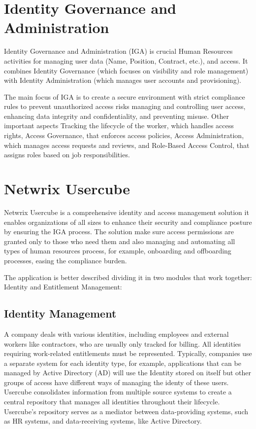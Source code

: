 \section{Identity Governance and Administration}

Identity Governance and Administration (IGA) is crucial Human Resources activities for managing user data (Name, Position, Contract, etc.), and access. It combines Identity Governance (which focuses on visibility and role management) with Identity Administration (which manages user accounts and provisioning).

The main focus of IGA is to create a secure environment with strict compliance rules to prevent unauthorized access risks managing and controlling user access, enhancing data integrity and confidentiality, and preventing misuse. Other important aspects Tracking the lifecycle of the worker, which handles access rights, Access Governance, that enforces access policies, Access Administration, which manages access requests and reviews, and Role-Based Access Control, that assigns roles based on job responsibilities.


\section{Netwrix Usercube}

Netwrix Usercube is a comprehensive identity and access management solution it enables organizations of all sizes to enhance their security and compliance posture by ensuring the IGA process. The solution make sure access permissions are granted only to those who need them and also managing and automating all types of human resources process, for example, onboarding and offboarding processes, easing the compliance burden.  

The application is better described dividing it in two modules that work together: Identity and Entitlement Management:

\subsection{Identity Management}

A company deals with various identities, including employees and external workers like contractors, who are usually only tracked for billing. All identities requiring work-related entitlements must be represented. Typically, companies use a separate system for each identity type, for example, applications that can be managed by Active Directory (AD) will use the Identity stored on itself but other groups of access have different ways of managing the identy of these users. Usercube consolidates information from multiple source systems to create a central repository that manages all identities throughout their lifecycle. Usercube's repository serves as a mediator between data-providing systems, such as HR systems, and data-receiving systems, like Active Directory.

